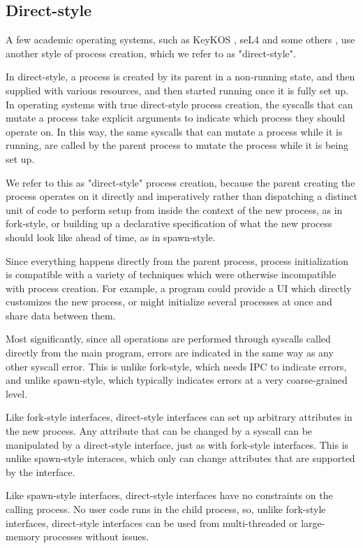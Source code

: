 \documentclass{acmart}
\begin{document}
\subsection{Direct-style}
A few academic operating systems, such as KeyKOS \cite{keykos}, seL4 \cite{sel4}
and some others \cite{exokernel} \cite{fuschia} \cite{singularity},
use another style of process creation, which we refer to as "direct-style".

In direct-style, a process is created by its parent in a non-running state,
and then supplied with various resources,
and then started running once it is fully set up.
In operating systems with true direct-style process creation,
the syscalls that can mutate a process
take explicit arguments to indicate which process they should operate on.
In this way, the same syscalls that can mutate a process while it is running,
are called by the parent process to mutate the process while it is being set up.

We refer to this as "direct-style" process creation,
because the parent creating the process operates on it directly and imperatively
rather than dispatching a distinct unit of code to perform setup from inside the context of the new process,
as in fork-style,
or building up a declarative specification of what the new process should look like ahead of time,
as in spawn-style.

Since everything happens directly from the parent process,
process initialization is compatible with a variety of techniques
which were otherwise incompatible with process creation.
For example, a program could provide a UI which directly customizes the new process,
or might initialize several processes at once and share data between them.

Most significantly,
since all operations are performed through syscalls called directly from the main program,
errors are indicated in the same way as any other syscall error.
This is unlike fork-style, which needs IPC to indicate errors,
and unlike spawn-style, which typically indicates errors at a very coarse-grained level.

Like fork-style interfaces,
direct-style interfaces can set up arbitrary attributes in the new process.
Any attribute that can be changed by a syscall
can be manipulated by a direct-style interface,
just as with fork-style interfaces.
This is unlike spawn-style interaces,
which only can change attributes that are supported by the interface.

Like spawn-style interfaces,
direct-style interfaces have no constraints on the calling process.
No user code runs in the child process,
so, unlike fork-style interfaces,
direct-style interfaces can be used from multi-threaded or large-memory processes without issues.
\end{document}
